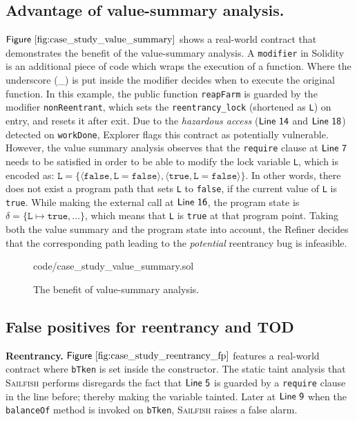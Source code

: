 \documentclass[conference, romanappendices]{tex/IEEEtran}
\theoremstyle{bfnote}
\newcommand{\toolname}{\textsc{Sailfish}\xspace}
\newcommand{\explorer}{{\sc Explorer}\xspace}
\newcommand{\refiner}{{\sc Refiner}\xspace}
\newcommand{\solidity}{{\sc Solidity}\xspace}
\newcommand{\reentrancy}{{reentrancy}\xspace}
\newcommand{\vsa}{{value-summary analysis}\xspace}
\newcommand{\Line}[1]{\ensuremath{\sf Line~ #1}}
\newcommand{\Fig}[1]{\ensuremath{\sf Figure~\ref{#1}}}
\newcommand{\valEnv}{\delta}
\begin{document}
\subsection{Advantage of \vsa.}
\label{app:vsa_advantage}
\Fig{fig:case_study_value_summary} shows a real-world contract that demonstrates the benefit of the \vsa.
A \texttt{modifier} in \solidity{} is an additional piece of code which wraps the execution of a function.
Where the underscore (\_) is put inside the modifier decides when to execute the original function.
In this example, the public function \texttt{reapFarm} is guarded by the modifier \texttt{nonReentrant}, which sets the \texttt{reentrancy\_lock} (shortened as \texttt{L}) on entry, and resets it after exit.
Due to the \textit{hazardous access} (\Line{14} and \Line{18}) detected on \texttt{workDone}, \explorer flags this contract as potentially vulnerable.
However, the value summary analysis observes that the \texttt{require} clause at \Line{7} needs to be satisfied in order to be able to modify the lock variable \texttt{L}, which is encoded as: $\texttt{L} = \{\langle \mathtt{false},\mathtt{L=false} \rangle, \langle  \mathtt{true},\mathtt{L=false}  \rangle\}$.
In other words, there does not exist a program path that sets \texttt{L} to \texttt{false}, if the current value of \texttt{L} is \texttt{true}.
While making the external call at \Line{16}, the program state is $\valEnv=\{\mathtt{L}\mapsto \mathtt{true},...\}$, which means that \texttt{L} is \texttt{true} at that program point.
Taking both the value summary and the program state into account, the \refiner{} decides that the corresponding path leading to the \textit{potential} \reentrancy bug is infeasible.

\begin{figure}[t]
	
	{code/case_study_value_summary.sol}
	\vspace{-5mm}
	\caption{The benefit of \vsa.
	}
	\label{fig:case_study_value_summary}
\end{figure}

\subsection{False positives for \reentrancy and TOD}
\label{sec:case_study_reent_fp}
\noindent
\textbf{Reentrancy.} \Fig{fig:case_study_reentrancy_fp} features a real-world contract where \texttt{bTken} is set inside the constructor.
The static taint analysis that \toolname{} performs disregards the fact that \Line{5} is guarded by a \texttt{require} clause in the line before; thereby making the variable tainted.
Later at \Line{9} when the \texttt{balanceOf} method is invoked on \texttt{bTken}, \toolname raises a false alarm.
\end{document}
